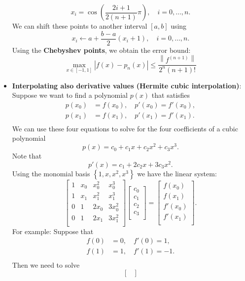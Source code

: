 \documentclass{report}
\begin{document}
\begin{itemize}
    $$x_i = \cos\left(\frac{2i+1}{2(n+1)}\pi\right), \quad i = 0,\ldots,n.$$
    We can shift these points to another interval $[a,b]$ using 
    $$x_i \gets a + \frac{b-a}{2}(x_i + 1), \quad i = 0,\ldots,n.$$
    Using the \textbf{Chebyshev points}, we obtain the error bound:
    $$\max_{x \in [-1,1]} \left|f(x) - p_n(x)\right| \leq \frac{\left\|f^{(n+1)}\right\|}{2^n(n+1)!}$$
\item \textbf{Interpolating also derivative values (Hermite cubic interpolation)}:
    Suppose we want to find a polynomial $p(x)$ that satisfies
    \begin{align*}
        p(x_0) &= f(x_0), \quad p'(x_0) = f'(x_0),\\
        p(x_1) &= f(x_1), \quad p'(x_1) = f'(x_1).\\
    \end{align*}
    We can use these four equations to solve for the four coefficients of a cubic polynomial
    $$p(x) = c_0 + c_1x + c_2x^2 + c_3x^3.$$
    Note that 
    $$p'(x) = c_1 + 2c_2x + 3c_3x^2.$$
    Using the monomial basis $\left\{1, x, x^2, x^3\right\}$ we have the linear system:
    $$
    \begin{bmatrix}
        1 & x_0 & x_0^2 &   x_0^3 \\
        1 & x_1 & x_1^2 &   x_1^3 \\
        0 &   1 & 2 x_0 & 3 x_0^2 \\
        0 &   1 & 2 x_1 & 3 x_1^2 \\
    \end{bmatrix}
    \begin{bmatrix}
        c_0\\c_1\\c_2\\c_3\\
    \end{bmatrix}
    =
    \begin{bmatrix}
        f(x_0)\\f(x_1)\\f'(x_0)\\f'(x_1)\\
    \end{bmatrix}.
    $$
    \bigbreak \noindent 
    For example: Suppose that 
    \begin{align*}
        f(0) &= 0, \quad f'(0) =  1,\\
        f(1) &= 1, \quad f'(1) = -1.\\
    \end{align*}
    Then we need to solve
    $$
    \begin{bmatrix}

\end{bmatrix}$$
\end{itemize}
\end{document}
